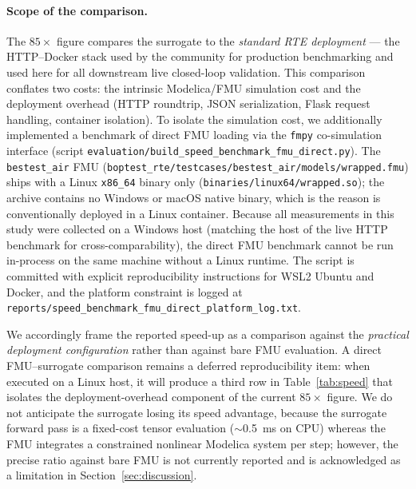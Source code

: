 \paragraph{Scope of the comparison.}
The $85\times$ figure compares the surrogate to the \emph{standard
\boptest{} RTE deployment} --- the HTTP--Docker stack used by the
\boptest{} community for production benchmarking and used here for all
downstream live closed-loop validation. This comparison conflates two
costs: the intrinsic Modelica/FMU simulation cost and the deployment
overhead (HTTP roundtrip, JSON serialization, Flask request handling,
container isolation). To isolate the simulation cost, we additionally
implemented a benchmark of direct FMU loading via the \texttt{fmpy}
co-simulation interface (script
\texttt{evaluation/build\_speed\_benchmark\_fmu\_direct.py}). The
\boptest{} \texttt{bestest\_air} FMU
(\texttt{boptest\_rte/testcases/bestest\_air/models/wrapped.fmu})
ships with a Linux \texttt{x86\_64} binary only
(\texttt{binaries/linux64/wrapped.so}); the archive contains no
Windows or macOS native binary, which is the reason \boptest{} is
conventionally deployed in a Linux container. Because all measurements
in this study were collected on a Windows host (matching the host of
the live HTTP benchmark for cross-comparability), the direct FMU
benchmark cannot be run in-process on the same machine without a
Linux runtime. The script is committed with explicit reproducibility
instructions for WSL2 Ubuntu and Docker, and the platform constraint
is logged at
\texttt{reports/speed\_benchmark\_fmu\_direct\_platform\_log.txt}.

We accordingly frame the reported speed-up as a comparison against the
\emph{practical \boptest{} deployment configuration} rather than
against bare FMU evaluation. A direct FMU--surrogate comparison
remains a deferred reproducibility item: when executed on a Linux
host, it will produce a third row in Table~\ref{tab:speed} that
isolates the deployment-overhead component of the current $85\times$
figure. We do not anticipate the surrogate losing its speed advantage,
because the surrogate forward pass is a fixed-cost tensor evaluation
($\sim$\SI{0.5}{\milli\second} on CPU) whereas the FMU integrates a
constrained nonlinear Modelica system per step; however, the precise
ratio against bare FMU is not currently reported and is acknowledged
as a limitation in Section~\ref{sec:discussion}.


